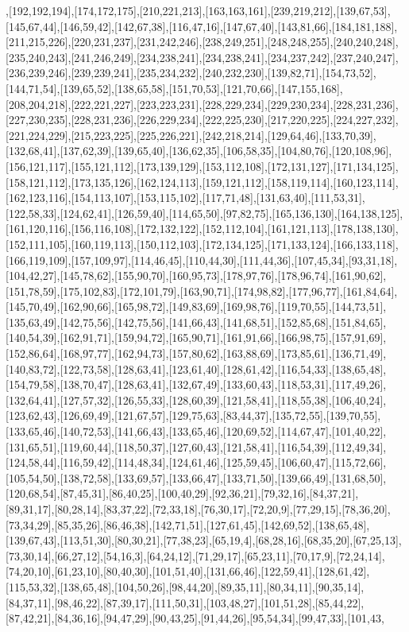 ,[192,192,194],[174,172,175],[210,221,213],[163,163,161],[239,219,212],[139,67,53],[145,67,44],[146,59,42],[142,67,38],[116,47,16],[147,67,40],[143,81,66],[184,181,188],[211,215,226],[220,231,237],[231,242,246],[238,249,251],[248,248,255],[240,240,248],[235,240,243],[241,246,249],[234,238,241],[234,238,241],[234,237,242],[237,240,247],[236,239,246],[239,239,241],[235,234,232],[240,232,230],[139,82,71],[154,73,52],[144,71,54],[139,65,52],[138,65,58],[151,70,53],[121,70,66],[147,155,168],[208,204,218],[222,221,227],[223,223,231],[228,229,234],[229,230,234],[228,231,236],[227,230,235],[228,231,236],[226,229,234],[222,225,230],[217,220,225],[224,227,232],[221,224,229],[215,223,225],[225,226,221],[242,218,214],[129,64,46],[133,70,39],[132,68,41],[137,62,39],[139,65,40],[136,62,35],[106,58,35],[104,80,76],[120,108,96],[156,121,117],[155,121,112],[173,139,129],[153,112,108],[172,131,127],[171,134,125],[158,121,112],[173,135,126],[162,124,113],[159,121,112],[158,119,114],[160,123,114],[162,123,116],[154,113,107],[153,115,102],[117,71,48],[131,63,40],[111,53,31],[122,58,33],[124,62,41],[126,59,40],[114,65,50],[97,82,75],[165,136,130],[164,138,125],[161,120,116],[156,116,108],[172,132,122],[152,112,104],[161,121,113],[178,138,130],[152,111,105],[160,119,113],[150,112,103],[172,134,125],[171,133,124],[166,133,118],[166,119,109],[157,109,97],[114,46,45],[110,44,30],[111,44,36],[107,45,34],[93,31,18],[104,42,27],[145,78,62],[155,90,70],[160,95,73],[178,97,76],[178,96,74],[161,90,62],[151,78,59],[175,102,83],[172,101,79],[163,90,71],[174,98,82],[177,96,77],[161,84,64],[145,70,49],[162,90,66],[165,98,72],[149,83,69],[169,98,76],[119,70,55],[144,73,51],[135,63,49],[142,75,56],[142,75,56],[141,66,43],[141,68,51],[152,85,68],[151,84,65],[140,54,39],[162,91,71],[159,94,72],[165,90,71],[161,91,66],[166,98,75],[157,91,69],[152,86,64],[168,97,77],[162,94,73],[157,80,62],[163,88,69],[173,85,61],[136,71,49],[140,83,72],[122,73,58],[128,63,41],[123,61,40],[128,61,42],[116,54,33],[138,65,48],[154,79,58],[138,70,47],[128,63,41],[132,67,49],[133,60,43],[118,53,31],[117,49,26],[132,64,41],[127,57,32],[126,55,33],[128,60,39],[121,58,41],[118,55,38],[106,40,24],[123,62,43],[126,69,49],[121,67,57],[129,75,63],[83,44,37],[135,72,55],[139,70,55],[133,65,46],[140,72,53],[141,66,43],[133,65,46],[120,69,52],[114,67,47],[101,40,22],[131,65,51],[119,60,44],[118,50,37],[127,60,43],[121,58,41],[116,54,39],[112,49,34],[124,58,44],[116,59,42],[114,48,34],[124,61,46],[125,59,45],[106,60,47],[115,72,66],[105,54,50],[138,72,58],[133,69,57],[133,66,47],[133,71,50],[139,66,49],[131,68,50],[120,68,54],[87,45,31],[86,40,25],[100,40,29],[92,36,21],[79,32,16],[84,37,21],[89,31,17],[80,28,14],[83,37,22],[72,33,18],[76,30,17],[72,20,9],[77,29,15],[78,36,20],[73,34,29],[85,35,26],[86,46,38],[142,71,51],[127,61,45],[142,69,52],[138,65,48],[139,67,43],[113,51,30],[80,30,21],[77,38,23],[65,19,4],[68,28,16],[68,35,20],[67,25,13],[73,30,14],[66,27,12],[54,16,3],[64,24,12],[71,29,17],[65,23,11],[70,17,9],[72,24,14],[74,20,10],[61,23,10],[80,40,30],[101,51,40],[131,66,46],[122,59,41],[128,61,42],[115,53,32],[138,65,48],[104,50,26],[98,44,20],[89,35,11],[80,34,11],[90,35,14],[84,37,11],[98,46,22],[87,39,17],[111,50,31],[103,48,27],[101,51,28],[85,44,22],[87,42,21],[84,36,16],[94,47,29],[90,43,25],[91,44,26],[95,54,34],[99,47,33],[101,43,